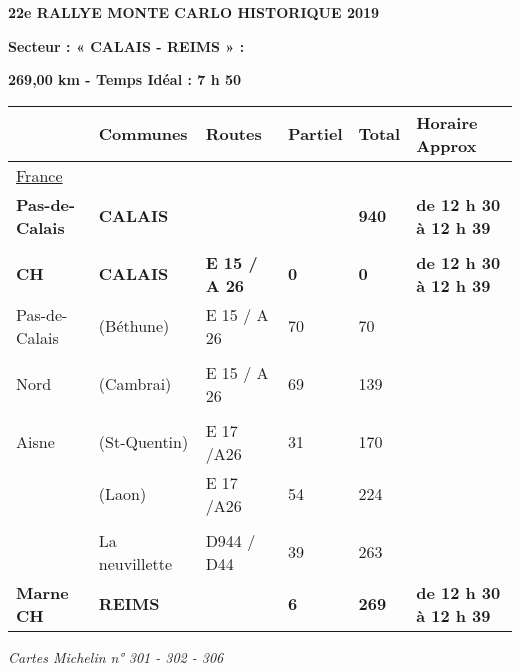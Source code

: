 \documentclass{article}%
\begin{document}
%
\normalsize%
\begin{center} \textbf{\LARGE{22e RALLYE MONTE CARLO HISTORIQUE 2019}} \end{center}%
\begin{flushleft} \textbf{Secteur : « CALAIS - REIMS » :
} \end{flushleft}%
\begin{flushright} \textbf{269,00 km - Temps Idéal : 7 h 50} \end{flushright}%
\begin{longtable}{p{2.25cm}|p{7.0cm}|p{1.5cm}|p{1.5cm}|p{1.5cm}|p{3.5cm}}%
\hline%
&Communes&Routes&Partiel&Total&Horaire Approx\\%
\hline%
\endhead%
\endfoot%
\endlastfoot%
\underline{﻿France}& & & & & \\%
\textbf{Pas-de-Calais}&\textbf{CALAIS}& & &\textbf{940}&\textbf{de 12 h 30 à 12 h 39}\\%
\hline& & & & & \\%
\textbf{CH}&\textbf{CALAIS}&\textbf{E 15 / A 26}&\textbf{0}&\textbf{0}&\textbf{de 12 h 30 à 12 h 39}\\%
Pas-de-Calais&(Béthune)&E 15 / A 26&70&70& \\%
\hline& & & & & \\%
Nord&(Cambrai)&E 15 / A 26&69&139& \\%
\hline& & & & & \\%
Aisne&(St-Quentin)&E 17 /A26&31&170& \\%
 &(Laon)&E 17 /A26&54&224& \\%
\hline& & & & & \\%
 &La neuvillette&D944 / D44&39&263& \\%
\textbf{Marne     CH}&\textbf{REIMS}& &\textbf{6}&\textbf{269}&\textbf{de 12 h 30 à 12 h 39}\\%
\hline%
\end{longtable}%
\begin{flushleft} \textit{Cartes Michelin n° 301 - 302 - 306
} \end{flushleft}%
\end{document}
